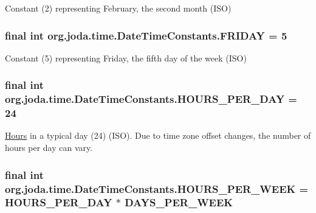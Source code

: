 Constant (2) representing February, the second month (I\-S\-O) \hypertarget{classorg_1_1joda_1_1time_1_1_date_time_constants_afb0fb4517687916aea12ea47d84b547c}{
\subsubsection[{F\-R\-I\-D\-A\-Y}]{\setlength{\rightskip}{0pt plus 5cm}final int org.\-joda.\-time.\-Date\-Time\-Constants.\-F\-R\-I\-D\-A\-Y = 5\hspace{0.3cm}{\ttfamily [static]}}}\label{classorg_1_1joda_1_1time_1_1_date_time_constants_afb0fb4517687916aea12ea47d84b547c}
Constant (5) representing Friday, the fifth day of the week (I\-S\-O) \hypertarget{classorg_1_1joda_1_1time_1_1_date_time_constants_a7f1596f04a1286361388fba599d75034}{
\subsubsection[{H\-O\-U\-R\-S\-\_\-\-P\-E\-R\-\_\-\-D\-A\-Y}]{\setlength{\rightskip}{0pt plus 5cm}final int org.\-joda.\-time.\-Date\-Time\-Constants.\-H\-O\-U\-R\-S\-\_\-\-P\-E\-R\-\_\-\-D\-A\-Y = 24\hspace{0.3cm}{\ttfamily [static]}}}\label{classorg_1_1joda_1_1time_1_1_date_time_constants_a7f1596f04a1286361388fba599d75034}
\hyperlink{classorg_1_1joda_1_1time_1_1_hours}{Hours} in a typical day (24) (I\-S\-O). Due to time zone offset changes, the number of hours per day can vary. \hypertarget{classorg_1_1joda_1_1time_1_1_date_time_constants_a482dc021925345fed47cf219455e9963}{
\subsubsection[{H\-O\-U\-R\-S\-\_\-\-P\-E\-R\-\_\-\-W\-E\-E\-K}]{\setlength{\rightskip}{0pt plus 5cm}final int org.\-joda.\-time.\-Date\-Time\-Constants.\-H\-O\-U\-R\-S\-\_\-\-P\-E\-R\-\_\-\-W\-E\-E\-K = {\bf H\-O\-U\-R\-S\-\_\-\-P\-E\-R\-\_\-\-D\-A\-Y} $\ast$ {\bf D\-A\-Y\-S\-\_\-\-P\-E\-R\-\_\-\-W\-E\-E\-K}\hspace{0.3cm}{\ttfamily [static]}}}\label{classorg_1_1joda_1_1time_1_1_date_time_constants_a482dc021925345fed47cf219455e9963}
